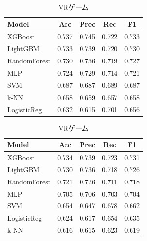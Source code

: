 \documentclass[uplatex, dvipdfmx, 11pt, a4paper, report]{jsbook}
\begin{document}
\begin{table}[H]
  \small
  \begin{minipage}[t]{0.49\textwidth}
    \centering
    \caption{コメディー}
    \begin{tabular}{l|c|c|c|c} \hline
      Model & Acc & Prec & Rec & F1 \\ \hline
      XGBoost & 0.737 & 0.745 & 0.722 & 0.733 \\
      LightGBM & 0.733 & 0.739 & 0.720 & 0.730 \\
      RandomForest & 0.730 & 0.736 & 0.719 & 0.727 \\
      MLP & 0.724 & 0.729 & 0.714 & 0.721 \\
      SVM & 0.687 & 0.687 & 0.689 & 0.687 \\
      k-NN & 0.658 & 0.659 & 0.657 & 0.658 \\
      LogisticReg & 0.632 & 0.615 & 0.701 & 0.656 \\ \hline
    \end{tabular}
  \end{minipage}
  \hfill
  \begin{minipage}[t]{0.49\textwidth}
    \centering
    \caption{VRゲーム}
    \begin{tabular}{l|c|c|c|c} \hline
      Model & Acc & Prec & Rec & F1 \\ \hline
      XGBoost & 0.734 & 0.739 & 0.723 & 0.731 \\
      LightGBM & 0.730 & 0.736 & 0.718 & 0.726 \\
      RandomForest & 0.721 & 0.726 & 0.711 & 0.718 \\
      MLP & 0.705 & 0.706 & 0.703 & 0.704 \\
      SVM & 0.654 & 0.647 & 0.678 & 0.662 \\
      LogisticReg & 0.624 & 0.617 & 0.654 & 0.635 \\
      k-NN & 0.616 & 0.615 & 0.623 & 0.619 \\ \hline
    \end{tabular}
  \end{minipage}
\end{table}
\end{document}
